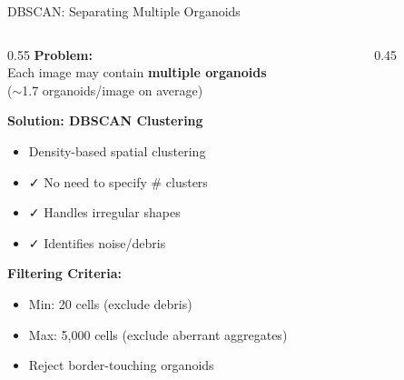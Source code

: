 \documentclass[aspectratio=169]{beamer}
\begin{document}
\begin{frame}{DBSCAN: Separating Multiple Organoids}
    \begin{columns}
        \begin{column}{0.55\textwidth}
            \textbf{Problem:}\\
            Each image may contain \textbf{multiple organoids}\\
            ($\sim$1.7 organoids/image on average)
            
            \vspace{0.5em}
            \textbf{Solution: DBSCAN Clustering}
            \begin{itemize}
                \item Density-based spatial clustering
                \item \textcolor{cysticGreen}{\faCheck} No need to specify \# clusters
                \item \textcolor{cysticGreen}{\faCheck} Handles irregular shapes
                \item \textcolor{cysticGreen}{\faCheck} Identifies noise/debris
            \end{itemize}
            
            \vspace{0.5em}
            \textbf{Filtering Criteria:}
            \begin{itemize}
                \item Min: 20 cells (exclude debris)
                \item Max: 5,000 cells (exclude aberrant aggregates)
                \item Reject border-touching organoids
            \end{itemize}
        \end{column}
        \begin{column}{0.45\textwidth}
            \begin{center}
\end{center}
\end{column}
\end{columns}
\end{frame}
\end{document}
